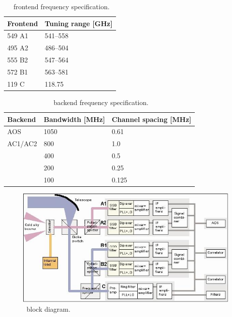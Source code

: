 \begin{table}
\caption{ \smr\ frontend frequency specification.}
\label{table:config1a}
\begin{tabular}{|l|l|}
  \hline
  \textbf{Frontend} & \textbf{Tuning range {[}GHz{]} } \\
  \hline
  549 A1            & 541--558              \\
  \hline
  495 A2            & 486--504              \\
  \hline
  555 B2            & 547--564             \\
 \hline
 572 B1             & 563--581              \\
 \hline
  119 C             &  118.75               \\
\hline
\end{tabular}
\end{table}



\begin{table}
\caption{ \smr\ backend frequency specification.}
\label{table:config1b}
\begin{tabular}{|l|l|l|}
  \hline
  \textbf{Backend} & \textbf{Bandwidth {[}MHz{]}} & \textbf{Channel spacing {[}MHz{]}} \\
  \hline
  AOS              & 1050                & 0.61\\
  \hline
  AC1/AC2          & 800                 & 1.0
 \\
 \cline{2-2}
 \cline{3-3}
                   & 400                  & 0.5 \\
 \cline{2-2}
 \cline{3-3}
                   & 200                  & 0.25 \\
 \cline{2-2}
 \cline{3-3}
                   & 100                 & 0.125 \\
\hline
\end{tabular}
\end{table}


\begin{figure}[t]
\includegraphics[width=14cm]{Odin_Auto2.jpg}
\caption{\smr\ block diagram.}
\label{fig:blockdiagram}
\end{figure}




